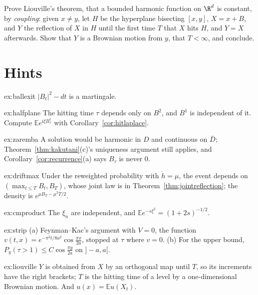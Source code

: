 \begin{exercise}[$\star\star\star$]\label{ex:liouville}
Prove Liouville's theorem, that a bounded harmonic function on $\R^d$ is constant, by \emph{coupling}: given $x\ne y$, let $H$ be the hyperplane bisecting $[x,y]$, $X=x+B$, and $Y$ the reflection of $X$ in $H$ until the first
time $T$ that $X$ hits $H$, and $Y=X$ afterwards. Show that $Y$ is a Brownian motion from $y$, that $T<\infty$, and conclude.
\end{exercise}

\section{Hints}

\begin{hint}{ex:ballexit}
$|B_t|^2-dt$ is a martingale.
\end{hint}

\begin{hint}{ex:halfplane}
The hitting time $\tau$ depends only on $B^2$, and $B^1$ is independent of it. Compute $\mathbb Ee^{i\xi B^1_\tau}$ with Corollary~\ref{cor:hitlaplace}.
\end{hint}

\begin{hint}{ex:zaremba}
A solution would be harmonic in $D$ and continuous on $\bar D$; Theorem~\ref{thm:kakutani}(c)'s uniqueness argument still applies, and Corollary~\ref{cor:recurrence}(a) says $B_\tau$ is never $0$.
\end{hint}

\begin{hint}{ex:driftmax}
Under the reweighted probability with $\dot h=\mu$, the event depends on $(\max_{t\le T}B_t,B_T)$, whose joint law is in Theorem~\ref{thm:jointreflection}; the density is $e^{\mu B_T-\mu^2T/2}$.
\end{hint}

\begin{hint}{ex:cmproduct}
The $\xi_n$ are independent, and $\mathbb Ee^{-s\xi^2}=(1+2s)^{-1/2}$.
\end{hint}

\begin{hint}{ex:strip}
(a) Feynman--Kac's argument with $V=0$, the function $v(t,x)=e^{-\pi^2t/8a^2}\cos\frac{\pi x}{2a}$, stopped at $\tau$ where $v=0$. (b) For the upper bound, $P_y(\tau>1)\le C\cos\frac{\pi y}{2a}$ on $]-a,a[$.
\end{hint}

\begin{hint}{ex:liouville}
$Y$ is obtained from $X$ by an orthogonal map until $T$, so its increments have the right brackets; $T$ is the hitting time of a level by a one-dimensional Brownian motion. And $u(x)=\mathbb Eu(X_t)$.
\end{hint}

